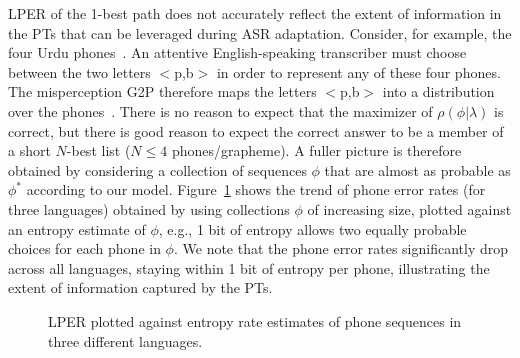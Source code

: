 

LPER of the 1-best path does not
accurately reflect the extent of information in the PTs that can be
leveraged during ASR adaptation.  Consider, for example, the four
Urdu phones~\ipa{[p,p\textsuperscript{h},b,\"*b]}.  An attentive
English-speaking transcriber must choose between the two letters
$<$p,b$>$ in order to represent any of these four phones.  The
misperception G2P therefore maps the letters $<$p,b$>$ into a
distribution over the phones~\ipa{[p,p\textsuperscript{h},b,\"*b]}.
There is no reason to expect that the maximizer of
$\rho(\phi|\lambda)$ is correct, but there is good reason to expect
the correct answer to be a member of a short $N$-best list ($N\le 4$
phones/grapheme).  A fuller picture is therefore obtained by
considering a collection of sequences $\phi$ that are almost as
probable as $\phi^*$ according to our model. Figure~\ref{fig:listPER}
shows the trend of phone error rates (for three languages) obtained by
using collections $\phi$ of increasing size, plotted against an
entropy estimate of $\phi$, e.g., 1 bit of entropy allows two equally
probable choices for each phone in $\phi$. We note that the phone
error rates significantly drop across all languages, staying within 1
bit of entropy per phone, illustrating the extent of information
captured by the PTs.

\begin{figure}[t!]
  
  \vspace*{-1cm}
  \caption{LPER plotted against entropy rate estimates of phone sequences in three different languages.}
\label{fig:listPER}
\end{figure}

